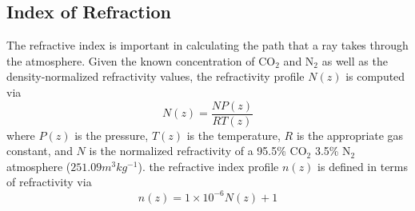 \subsection{Index of Refraction}
The refractive index is important in calculating the path that a ray takes through the atmosphere. Given the known concentration of CO$_2$ and N$_2$ as well as the density-normalized refractivity values, the refractivity profile $N(z)$ is computed via
\begin{equation}
N(z) = \frac{NP(z)}{RT(z)}
\end{equation}
where $P(z)$ is the pressure, $T(z)$ is the temperature, $R$ is the appropriate gas constant, and $N$ is the normalized refractivity of a 95.5\% CO$_2$ 3.5\% N$_2$ atmosphere ($251.09 m^3kg^{-1}$)\cite{Essen-1951}. the refractive index profile $n(z)$ is defined in terms of refractivity via
\begin{equation}
n(z) = 1 \times 10^{-6} N(z) +1
\end{equation}
